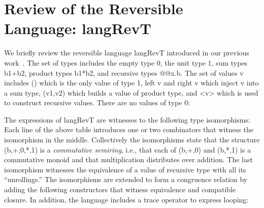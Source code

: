 \documentclass{llncs}
\begin{document}
\section{Review of the Reversible Language: {{langRevT}} }
\label{sec:pi}

We briefly review the reversible language {{langRevT}} introduced in our
previous work~\cite{rc2011,James:2012:IE:2103656.2103667}. The set of types
includes the empty type {{0}}, the unit type {{1}}, sum types {{b1+b2}},
product types {{b1*b2}}, and recursive types {{@@x.b}}. The set of values
{{v}} includes {{()}} which is the only value of type {{1}}, {{left v}} and
{{right v}} which inject {{v}} into a sum type, {{(v1,v2)}} which builds a
value of product type, and {{<v>}} which is used to construct recursive
values. There are no values of type {{0}}:

The expressions of {{langRevT}} are witnesses to the following type
isomorphisms:
Each line of the above table introduces one or two combinators that witness
the isomorphism in the middle. Collectively the isomorphisms state that the
structure {{(b,+,0,*,1)}} is a \emph{commutative semiring}, i.e., that each
of {{(b,+,0)}} and {{(b,*,1)}} is a commutative monoid and that
multiplication distributes over addition. The last isomorphism witnesses the
equivalence of a value of recursive type with all its ``unrollings.'' The
isomorphisms are extended to form a congruence relation by adding the
following constructors that witness equivalence and compatible closure. In
addition, the language includes a {{trace}} operator to express looping:
%
%
%
%
\end{document}
